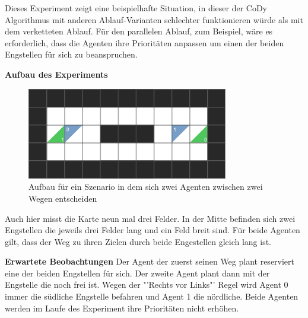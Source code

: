 Dieses Experiment zeigt eine beispielhafte Situation, in dieser der CoDy Algorithmus mit anderen Ablauf-Varianten schlechter funktionieren würde als mit dem verketteten Ablauf. Für den parallelen Ablauf, zum Beispiel, wäre es erforderlich, dass die Agenten ihre Prioritäten anpassen um einen der beiden Engstellen für sich zu beanspruchen. 

\textbf{Aufbau des Experiments}
\begin{figure}[H]
    \includegraphics[height=40mm]{images/two_slits.png}
    \centering
    \caption{Aufbau für ein Szenario in dem sich zwei Agenten zwischen zwei Wegen entscheiden}
    \label{fig:doppelspalt}
\end{figure}
Auch hier misst die Karte neun mal drei Felder. In der Mitte befinden sich zwei Engstellen die jeweils drei Felder lang und ein Feld breit sind. Für beide Agenten gilt, dass der Weg zu ihren Zielen durch beide Engestellen gleich lang ist.

\textbf{Erwartete Beobachtungen}\newline
Der Agent der zuerst seinen Weg plant reserviert eine der beiden Engstellen für sich. Der zweite Agent plant dann mit der Engstelle die noch frei ist. Wegen der "'Rechts vor Links"' Regel wird Agent 0 immer die südliche Engstelle befahren und Agent 1 die nördliche. Beide Agenten werden im Laufe des Experiment ihre Prioritäten nicht erhöhen.